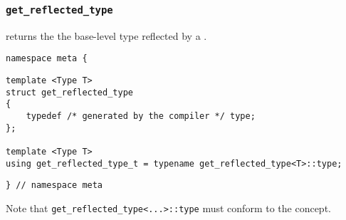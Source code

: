 

\subsubsection{\texttt{get\_reflected\_type}}

returns the the base-level type reflected by a .

\begin{verbatim}
namespace meta {
\end{verbatim}
\begin{verbatim}
template <Type T>
struct get_reflected_type
{
	typedef /* generated by the compiler */ type;
};
	
template <Type T>
using get_reflected_type_t = typename get_reflected_type<T>::type;

\end{verbatim}
\begin{verbatim}
} // namespace meta
\end{verbatim}


Note that \texttt{get\_reflected\_type<...>::type}
must conform to the  concept.
